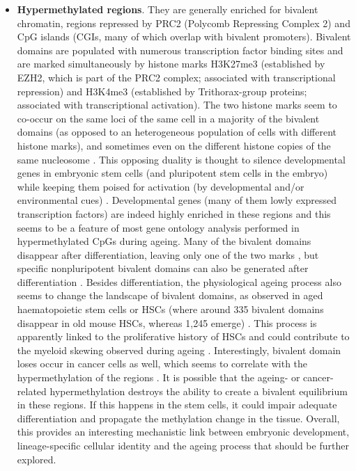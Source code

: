 \begin{itemize}
	
	\item \textbf{Hypermethylated regions}. They are generally enriched for bivalent chromatin, regions repressed by \acrshort{PRC2} (Polycomb Repressing Complex 2) and CpG islands (\acrshort{CGI}s, many of which overlap with bivalent promoters). Bivalent domains are populated with numerous transcription factor binding sites and are marked simultaneously by histone marks H3K27me3 (established by EZH2, which is part of the PRC2 complex; associated with transcriptional repression) and H3K4me3 (established by Trithorax-group proteins; associated with transcriptional activation). The two histone marks seem to co-occur on the same loci of the same cell in a majority of the bivalent domains (as opposed to an heterogeneous population of cells with different histone marks), and sometimes even on the different histone copies of the same nucleosome \cite{Voigt2013}. This opposing duality is thought to silence developmental genes in embryonic stem cells (and pluripotent stem cells in the embryo) while keeping them poised for activation (by developmental and/or environmental cues) \cite{Voigt2013}. Developmental genes (many of them lowly expressed transcription factors) are indeed highly enriched in these regions and this seems to be a feature of most gene ontology analysis performed in hypermethylated CpGs during ageing. Many of the bivalent domains disappear after differentiation, leaving only one of the two marks \cite{Bernstein2006}, but specific nonpluripotent bivalent domains can also be generated after differentiation \cite{Voigt2013}. Besides differentiation, the physiological ageing process also seems to change the landscape of bivalent domains, as observed in aged haematopoietic stem cells or \acrshort{HSCs} (where around 335 bivalent domains disappear in old mouse HSCs, whereas 1,245 emerge) \cite{Sun2014x}. This process is apparently linked to the proliferative history of \acrshort{HSCs} \cite{Beerman2013} and could contribute to the myeloid skewing observed during ageing \cite{Sun2014x,Beerman2013}. Interestingly, bivalent domain loses occur in cancer cells as well, which seems to correlate with the hypermethylation of the regions \cite{Bernhart2016}. It is possible that the ageing- or cancer-related hypermethylation destroys the ability to create a bivalent equilibrium in these regions. If this happens in the stem cells, it could impair adequate differentiation and propagate the methylation change in the tissue. Overall, this provides an interesting mechanistic link between embryonic development, lineage-specific cellular identity and the ageing process that should be further explored.   
	

\end{itemize}
